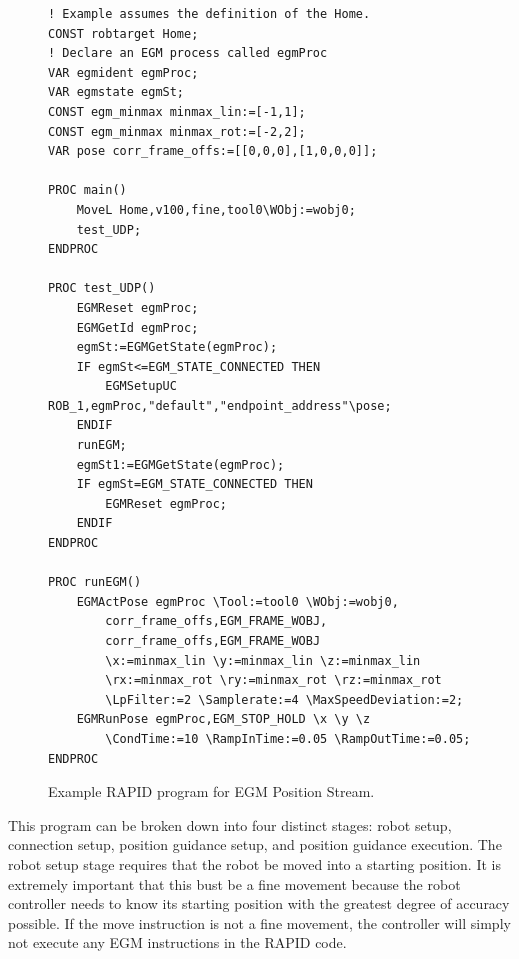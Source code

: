 \documentclass{cslthse-msc}
\begin{document}
\begin{figure}[H]
\vspace{0.75cm}
\centering
\begin{lstlisting}
! Example assumes the definition of the Home.
CONST robtarget Home;
! Declare an EGM process called egmProc
VAR egmident egmProc;
VAR egmstate egmSt;
CONST egm_minmax minmax_lin:=[-1,1];
CONST egm_minmax minmax_rot:=[-2,2];
VAR pose corr_frame_offs:=[[0,0,0],[1,0,0,0]];

PROC main()
    MoveL Home,v100,fine,tool0\WObj:=wobj0;
    test_UDP;
ENDPROC
	
PROC test_UDP()
    EGMReset egmProc;
    EGMGetId egmProc;
    egmSt:=EGMGetState(egmProc);
    IF egmSt<=EGM_STATE_CONNECTED THEN
        EGMSetupUC ROB_1,egmProc,"default","endpoint_address"\pose;
    ENDIF
    runEGM;
    egmSt1:=EGMGetState(egmProc);
    IF egmSt=EGM_STATE_CONNECTED THEN
        EGMReset egmProc;
    ENDIF
ENDPROC
    
PROC runEGM()
    EGMActPose egmProc \Tool:=tool0 \WObj:=wobj0,
        corr_frame_offs,EGM_FRAME_WOBJ,
        corr_frame_offs,EGM_FRAME_WOBJ
        \x:=minmax_lin \y:=minmax_lin \z:=minmax_lin
        \rx:=minmax_rot \ry:=minmax_rot \rz:=minmax_rot
        \LpFilter:=2 \Samplerate:=4 \MaxSpeedDeviation:=2;
    EGMRunPose egmProc,EGM_STOP_HOLD \x \y \z
        \CondTime:=10 \RampInTime:=0.05 \RampOutTime:=0.05;
ENDPROC
    \end{lstlisting}
    \caption{Example RAPID program for EGM Position Stream.}
    \label{fig:rapid_pos_guide}
\end{figure}

This program can be broken down into four distinct stages: robot setup, connection setup, position guidance setup, and position guidance execution. The robot setup stage requires that the robot be moved into a starting position. It is extremely important that this bust be a fine movement because the robot controller needs to know its starting position with the greatest degree of accuracy possible. If the move instruction is not a fine movement, the controller will simply not execute any EGM instructions in the RAPID code. \par
\end{document}

